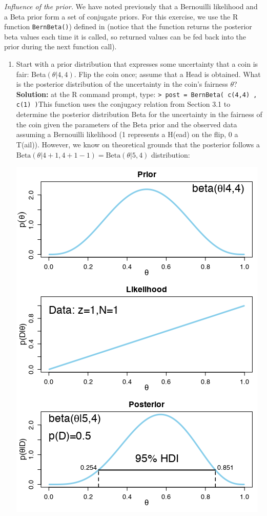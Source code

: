 \begin{Example} \label{ex4}\textit{Influence of the prior.}
We have noted previously that a Bernouilli likelihood and a Beta prior form a set of conjugate priors. For this exercise, we use the R function \texttt{BernBeta()}) defined in \cite{BDA_K} (notice that the function returns the posterior beta values each time it is called, so returned values can be fed back into the prior during the next function call).
\begin{enumerate}[label=(\alph*)]
	\item Start with a prior distribution that expresses some uncertainty that a coin is fair: Beta$(\theta |4, 4)$. Flip the coin once; assume that a Head is obtained. What is the posterior distribution of the uncertainty in the coin's fairness $\theta$? \newl 
	\textbf{Solution:} at the R command prompt, type: \newl \small \texttt{> post = BernBeta( c(4,4) , c(1) )}\normalsize\newl This function uses the conjugacy relation from Section 3.1 to determine the posterior distribution Beta for the uncertainty in the fairness of the coin given the parameters of the Beta prior and the observed data assuming a Bernouilli likelihood (1 represents a H(ead) on the flip, 0 a T(ail)). However, we know on theoretical grounds that the posterior follows a $\text{Beta}(\theta |4+1,4+1-1)=\text{Beta}(\theta |5,4)$ distribution: 
	\begin{center}
	\includegraphics[width=\linewidth]{Images/example51.png}

\end{center}
\end{enumerate}
\end{Example}
